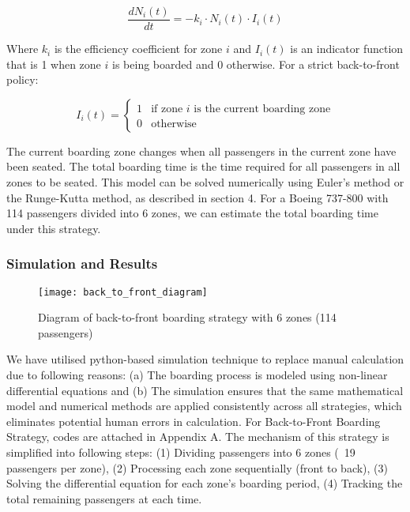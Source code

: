 \documentclass[12pt]{article}
\begin{document}
\begin{equation}
\frac{dN_i(t)}{dt} = -k_i \cdot N_i(t) \cdot I_i(t)
\end{equation}

Where $k_i$ is the efficiency coefficient for zone $i$ and $I_i(t)$ is an indicator function that is 1 when zone $i$ is being boarded and 0 otherwise. For a strict back-to-front policy:

\begin{equation}
I_i(t) = 
\begin{cases}
1 & \text{if zone $i$ is the current boarding zone} \\
0 & \text{otherwise}
\end{cases}
\end{equation}

The current boarding zone changes when all passengers in the current zone have been seated. The total boarding time is the time required for all passengers in all zones to be seated. This model can be solved numerically using Euler's method or the Runge-Kutta method, as described in section 4. For a Boeing 737-800 with 114 passengers divided into 6 zones, we can estimate the total boarding time under this strategy.

\subsubsection{Simulation and Results}

\begin{figure}[h]
    \centering
    \texttt{[image: back\_to\_front\_diagram]}
    \caption{Diagram of back-to-front boarding strategy with 6 zones (114 passengers)}
    \label{fig:back_to_front_diagram}
\end{figure}

We have utilised python-based simulation technique to replace manual calculation due to following reasons: (a) The boarding process is modeled using non-linear differential equations and (b) The simulation ensures that the same mathematical model and numerical methods are applied consistently across all strategies, which eliminates potential human errors in calculation. For Back-to-Front Boarding Strategy, codes are attached in Appendix A. The mechanism of this strategy is simplified into following steps: (1) Dividing passengers into 6 zones (~19 passengers per zone), (2) Processing each zone sequentially (front to back), (3) Solving the differential equation for each zone's boarding period, (4) Tracking the total remaining passengers at each time.
\end{document}
